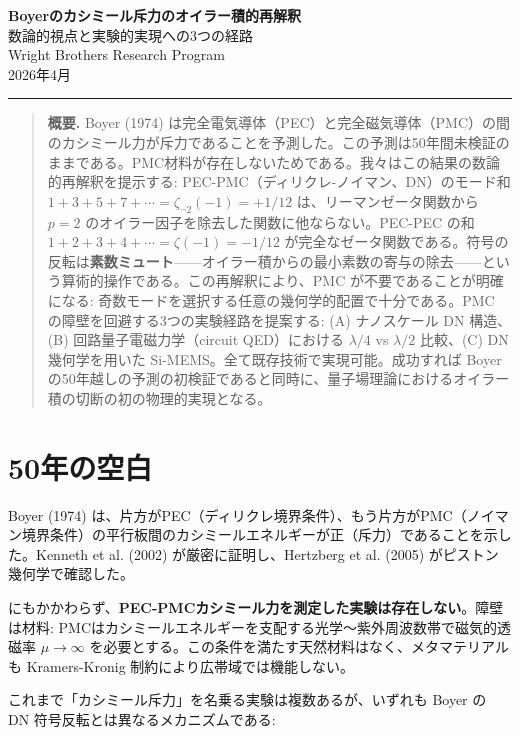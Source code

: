\documentclass[11pt,a4paper]{article}
\begin{document}
\begin{center}
{\LARGE\bfseries Boyerのカシミール斥力のオイラー積的再解釈}\\[0.3cm]
{\large 数論的視点と実験的実現への3つの経路}\\[0.5cm]
{\large Wright Brothers Research Program}\\[0.2cm]
{2026年4月}\\[0.3cm]
\rule{12cm}{0.4pt}
\end{center}

\begin{quotation}
\noindent\textbf{概要.}\quad
Boyer (1974) は完全電気導体（PEC）と完全磁気導体（PMC）の間のカシミール力が斥力であることを予測した。この予測は50年間未検証のままである。PMC材料が存在しないためである。我々はこの結果の数論的再解釈を提示する: PEC-PMC（ディリクレ-ノイマン、DN）のモード和 $1+3+5+7+\cdots = \zeta_{\neg 2}(-1) = +1/12$ は、リーマンゼータ関数から $p=2$ のオイラー因子を除去した関数に他ならない。PEC-PEC の和 $1+2+3+4+\cdots = \zeta(-1) = -1/12$ が完全なゼータ関数である。符号の反転は\textbf{素数ミュート}——オイラー積からの最小素数の寄与の除去——という算術的操作である。この再解釈により、PMC が不要であることが明確になる: 奇数モードを選択する任意の幾何学的配置で十分である。PMC の障壁を回避する3つの実験経路を提案する: (A) ナノスケール DN 構造、(B) 回路量子電磁力学（circuit QED）における $\lambda/4$ vs $\lambda/2$ 比較、(C) DN 幾何学を用いた Si-MEMS。全て既存技術で実現可能。成功すれば Boyer の50年越しの予測の初検証であると同時に、量子場理論におけるオイラー積の切断の初の物理的実現となる。
\end{quotation}

\section{50年の空白}

Boyer (1974) は、片方がPEC（ディリクレ境界条件）、もう片方がPMC（ノイマン境界条件）の平行板間のカシミールエネルギーが正（斥力）であることを示した。Kenneth et al. (2002) が厳密に証明し、Hertzberg et al. (2005) がピストン幾何学で確認した。

にもかかわらず、\textbf{PEC-PMCカシミール力を測定した実験は存在しない}。障壁は材料: PMCはカシミールエネルギーを支配する光学〜紫外周波数帯で磁気的透磁率 $\mu \to \infty$ を必要とする。この条件を満たす天然材料はなく、メタマテリアルも Kramers-Kronig 制約により広帯域では機能しない。

これまで「カシミール斥力」を名乗る実験は複数あるが、いずれも Boyer の DN 符号反転とは異なるメカニズムである:
\end{document}

